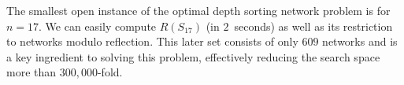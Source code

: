 \documentclass[10pt]{IEEEtran}
\begin{document}
The smallest open instance of the optimal depth sorting network
problem is for $n=17$. We can easily compute $R(S_{17})$ (in $2$~seconds)
as well as its restriction to networks modulo
reflection. This later set consists of only $609$ networks and is a key
ingredient to solving this
problem,
effectively reducing the search space more than
$300{,}000$-fold.



\end{document}
